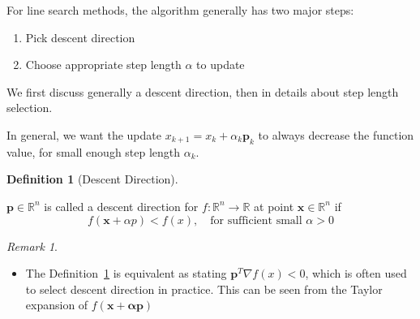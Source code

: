 \documentclass[
  letterpaper,
  DIV=11,
  numbers=noendperiod]{scrreprt}
\providecommand{\tightlist}{%
  \setlength{\itemsep}{0pt}\setlength{\parskip}{0pt}}
\theoremstyle{definition}
\newtheorem{definition}{Definition}[chapter]
\theoremstyle{plain}
\theoremstyle{plain}
\theoremstyle{definition}
\theoremstyle{plain}
\theoremstyle{plain}
\theoremstyle{remark}
\newtheorem{refremark}{Remark}[chapter]
\begin{document}
For line search methods, the algorithm generally has two major steps:

\begin{enumerate}
\def\labelenumi{\arabic{enumi}.}
\item
  Pick descent direction
\item
  Choose appropriate step length \(\alpha\) to update
\end{enumerate}

We first discuss generally a descent direction, then in details about
step length selection.

\begin{tcolorbox}[enhanced jigsaw, bottomrule=.15mm, title=\textcolor{quarto-callout-tip-color}{\faLightbulb}\hspace{0.5em}{What is a descent direction}, left=2mm, colback=white, toprule=.15mm, bottomtitle=1mm, titlerule=0mm, leftrule=.75mm, colbacktitle=quarto-callout-tip-color!10!white, opacitybacktitle=0.6, coltitle=black, colframe=quarto-callout-tip-color-frame, rightrule=.15mm, breakable, toptitle=1mm, arc=.35mm, opacityback=0]

In general, we want the update \(x_{k+1}=x_k+\alpha_k\mathbf{p}_k\) to
always decrease the function value, for small enough step length
\(\alpha_k\).

\end{tcolorbox}

\begin{definition}[Descent
Direction]\protect\hypertarget{def-descentDir}{}\label{def-descentDir}

\(\mathbf{p}\in\mathbb{R}^n\) is called a descent direction for
\(f:\mathbb{R}^n\rightarrow\mathbb{R}\) at point
\(\mathbf{x}\in\mathbb{R}^n\) if \[
f(\mathbf{x} + \alpha p )<f(x),\quad\text{for sufficient small } \alpha>0
\]

\end{definition}

\begin{refremark}
\leavevmode

\begin{itemize}
\tightlist
\item
  The Definition~\ref{def-descentDir} is equivalent as stating
  \(\mathbf{p}^T\nabla f(x)<0\), which is often used to select descent
  direction in practice. This can be seen from the Taylor expansion of
  \(f(\mathbf{x+\alpha \mathbf{p}})\)
\end{itemize}

\label{rem-descentDir}

\end{refremark}
\end{document}
